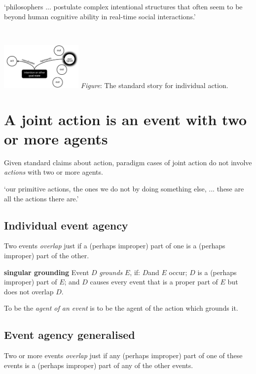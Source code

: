 \documentclass[11pt]{extarticle}
\begin{document}
\begin{multicols}{3}
`philosophers ... postulate complex intentional structures that often seem to be beyond human cognitive ability in real-time social interactions.'
\citep%
{Knoblich:2008hy}




\

\begin{center}
  \includegraphics[width=0.3\textwidth]{standard_story.png}
\emph{Figure}: The standard story for individual action.
\end{center}


\section{A joint action is an event with two or more agents\citep{ludwig_collective_2007}}

Given standard claims about action, paradigm cases of joint action do not involve \emph{actions} with two or more agents.

`our primitive actions, the ones we do not by doing something else, ... these are all the actions there are.'\citep%
{Davidson:1971fz}

\subsection{Individual event agency}
Two events \emph{overlap} just if a (perhaps improper) part of one is a (perhaps improper) part of the other.

\textbf{singular grounding} 
Event $D$ \emph{grounds} $E$, if: $D$and $E$ occur; 
$D$ is a (perhaps improper) part of $E$; and 
$D$ causes every event that is a proper part of $E$ but does not overlap $D$.

To be the \emph{agent of an event} is to be the agent of the action which grounds it.\citep%
{pietroski_actions_1998}


\subsection{Event agency generalised}
Two or more events \emph{overlap} just if any (perhaps improper) part of one of these events is a (perhaps improper) part of any of the other events.


\end{multicols}
\end{document}
